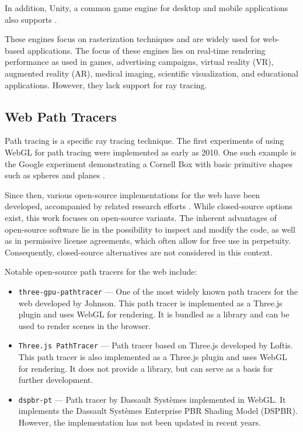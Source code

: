 In addition, \gls{Unity}, a common game engine for desktop and mobile applications also supports  \cite{unityWebGLCompatibility}.

These engines focus on rasterization techniques and are widely used for web-based applications. The focus of these engines lies on real-time rendering performance as used in games, advertising campaigns, virtual reality (VR), augmented reality (AR), medical imaging, scientific visualization, and educational applications. However, they lack support for ray tracing. 

\subsection*{Web Path Tracers}

Path tracing is a specific ray tracing technique. The first experiments of using \gls{WebGL} for path tracing were implemented as early as 2010. One such example is the Google experiment demonstrating a Cornell Box \cite{goral1984modeling} with basic primitive shapes such as spheres and planes \cite{pathTracerWallace}.

Since then, various open-source implementations for the web have been developed, accompanied by related research efforts \cite{academicWebGLPathTracer, academicWebGLPathTracer2}. While closed-source options exist, this work focuses on open-source variants. The inherent advantages of open-source software lie in the possibility to inspect and modify the code, as well as in permissive license agreements, which often allow for free use in perpetuity. Consequently, closed-source alternatives are not considered in this context.

Notable open-source path tracers for the web include:

\begin{itemize}
  \item{\texttt{three-gpu-pathtracer}} \cite{ThreeJsPathTracerJohnson} — One of the most widely known path tracers for the web developed by Johnson. This path tracer is implemented as a \gls{Three.js} plugin and uses \gls{WebGL} for rendering.  It is bundled as a library and can be used to render scenes in the browser.
  \item{\texttt{Three.js PathTracer}} \cite{ThreeJsPathTracerLoftis} — Path tracer based on \gls{Three.js} developed by Loftis. This path tracer is also implemented as a \gls{Three.js} plugin and uses \gls{WebGL} for rendering. It does not provide a library, but can serve as a basis for further development.
  \item{\texttt{dspbr-pt}} \cite{PathTracerDassault} — Path tracer by Dassault Systèmes implemented in \gls{WebGL}. It implements the Dassault Systèmes Enterprise PBR Shading Model (\gls{DSPBR}). However, the implementation has not been updated in recent years.
\end{itemize}

